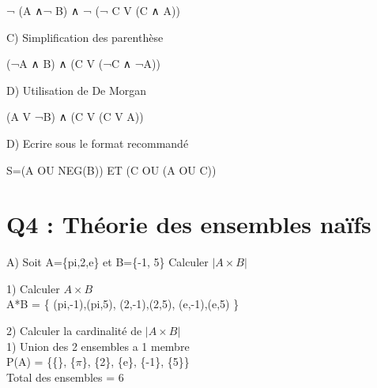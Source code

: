   ¬ (A ∧¬ B) ∧ ¬ (¬ C V (C ∧ A)) \\

\begin{flushleft}
C) Simplification des parenthèse \\
\end{flushleft}

  (¬A ∧ B) ∧ (C V (¬C ∧ ¬A)) \\

\begin{flushleft}
D) Utilisation de De Morgan \\
\end{flushleft}

(A V ¬B) ∧ (C V (C V A)) \\

\begin{flushleft}
D) Ecrire sous le format recommandé \\
\end{flushleft}

S=(A OU NEG(B)) ET (C OU (A OU C)) \\


\vspace{10mm} %

\section{Q4 : Théorie des ensembles naïfs}

\vspace{4mm} %

A) Soit A=\{pi,2,e\} et B=\{-1, 5\} Calculer ${|A\times B|}$ \\

\vspace{4mm} %

1) Calculer ${A\times B}$ \\

A*B = \{ (pi,-1),(pi,5), (2,-1),(2,5), (e,-1),(e,5) \}

\vspace{8mm} %

2) Calculer la cardinalité de ${|A\times B|}$ \\

1) Union des 2 ensembles a 1 membre \\

P(A) = \{\{\}, \{$\pi$\}, \{2\}, \{e\}, \{-1\}, \{5\}\} \\

Total des ensembles = 6 \\

